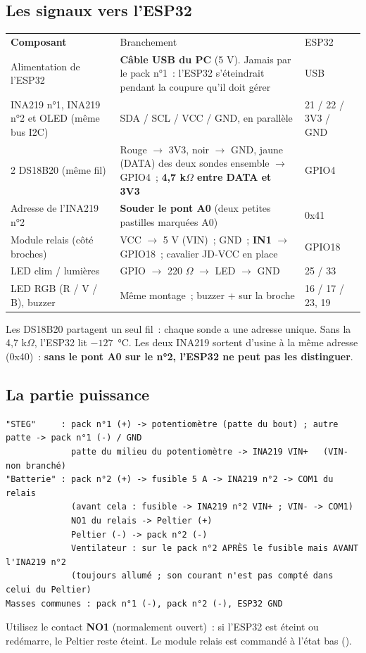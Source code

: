 \subsection{Les signaux vers l'ESP32}
\begin{tabularx}{\linewidth}{P{4.2cm}LP{2.2cm}}
 \textbf{Composant} & Branchement & ESP32 \\
Alimentation de l'ESP32 & \textbf{Câble USB du PC} (5 V). Jamais par le pack n°1~: l'ESP32 s'éteindrait pendant la coupure qu'il doit gérer & USB \\
INA219 n°1, INA219 n°2 et OLED (même bus I2C) & SDA / SCL / VCC / GND, en parallèle & 21 / 22 / 3V3 / GND \\
2 DS18B20 (même fil) & Rouge $\rightarrow$ 3V3, noir $\rightarrow$ GND, jaune (DATA) des deux sondes ensemble $\rightarrow$ GPIO4~; \textbf{4,7 k$\Omega$ entre DATA et 3V3} & GPIO4 \\
Adresse de l'INA219 n°2 & \textbf{Souder le pont A0} (deux petites pastilles marquées A0) & 0x41 \\
Module relais (côté broches) & VCC $\rightarrow$ 5 V (VIN)~; GND~; \textbf{IN1} $\rightarrow$ GPIO18~; cavalier JD-VCC en place & GPIO18 \\
LED clim / lumières & GPIO $\rightarrow$ 220 $\Omega$ $\rightarrow$ LED $\rightarrow$ GND & 25 / 33 \\
LED RGB (R / V / B), buzzer & Même montage~; buzzer + sur la broche & 16 / 17 / 23, 19 \\
\end{tabularx}

{\small Les DS18B20 partagent un seul fil~: chaque sonde a une adresse unique. Sans la 4,7 k$\Omega$, l'ESP32 lit $-127$~°C. Les deux INA219 sortent d'usine à la même adresse (0x40)~: \textbf{sans le pont A0 sur le n°2, l'ESP32 ne peut pas les distinguer}.}

\subsection{La partie puissance}
\begin{lstlisting}[style=cmd]
"STEG"     : pack n°1 (+) -> potentiomètre (patte du bout) ; autre patte -> pack n°1 (-) / GND
             patte du milieu du potentiomètre -> INA219 VIN+   (VIN- non branché)
"Batterie" : pack n°2 (+) -> fusible 5 A -> INA219 n°2 -> COM1 du relais
             (avant cela : fusible -> INA219 n°2 VIN+ ; VIN- -> COM1)
             NO1 du relais -> Peltier (+)
             Peltier (-) -> pack n°2 (-)
             Ventilateur : sur le pack n°2 APRÈS le fusible mais AVANT l'INA219 n°2
             (toujours allumé ; son courant n'est pas compté dans celui du Peltier)
Masses communes : pack n°1 (-), pack n°2 (-), ESP32 GND
\end{lstlisting}
Utilisez le contact \textbf{NO1} (normalement ouvert)~: si l'ESP32 est éteint ou redémarre, le Peltier reste éteint. Le module relais est commandé à l'état bas ().

